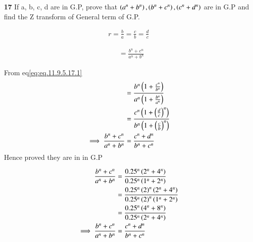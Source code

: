 \documentclass[journal,12pt,twocolumn]{IEEEtran}
\theoremstyle{remark}
\begin{document}


\vspace{3cm}

\title{}
\author{EE23BTECH11047 - Deepakreddy P
}
\maketitle
\newpage
\bigskip

\noindent \textbf{17} \quad 
If a, b, c, d are in G.P, prove that 
$ \left(a^{n} + b^{n}\right),\left(b^{n} + c^{n}\right),\left(c^{n} + d^{n}\right) $ are in G.P and find the Z transform of General term of G.P.\\
\solution

\begin{center}
    \begin{table}[ht]
        
    \end{table}
\end{center}

\begin{align}   
r=\frac{b}{a} = \frac{c}{b}= \frac{d}{c} \label{eq:eq.11.9.5.17.1}
\end{align}

\begin{align} 
   &= \frac{b^n + c^n }{a^n + b^n}
\end{align}

From eq\eqref{eq:eq.11.9.5.17.1}\\

\begin{align}
   &= \frac{b^n \left(1 + \frac{c^n}{b^n} \right) }{a^n \left(1 + \frac{b^n}{a^n}\right)}\\
   &= \frac{c^n \left(1 + \left(\frac{d}{c}\right)^n \right)}{b^n \left(1 + \left(\frac{c}{b}\right)^n \right)}\\
\implies \frac{b^n + c^n }{a^n + b^n} &= \frac{c^n + d^n}{b^n + c^n}
\end{align}
Hence proved they are in in G.P

\bigskip  
\begin{center}
    \begin{table}[ht]
        
    \end{table}
\end{center}

\begin{align}
\frac{b^n + c^n}{a^n + b^n} &= \frac{0.25^n \left(2^n + 4^n\right)}{0.25^n \left(1^n + 2^n\right)}\\
&= \frac{0.25^n  \left(2\right)^n \left(2^n + 4^n\right)}{0.25^n \left(2\right)^n \left(1^n + 2^n\right)}\\
&= \frac{0.25^n \left(4^n + 8^n\right)}{0.25^n \left(2^n + 4^n\right)}\\
\implies \frac{b^n + c^n }{a^n + b^n} &= \frac{c^n + d^n}{b^n + c^n}
\end{align}
\end{document}
